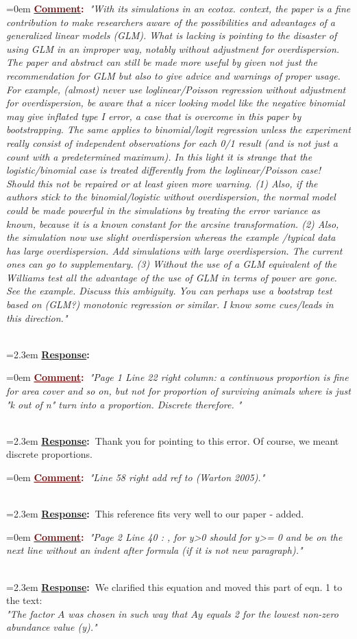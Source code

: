 \documentclass[12pt]{article}
\newcommand{\comment}[1]{
	\vspace{2em} \noindent \hangindent=0em \textbf{\textcolor{Maroon}{\uline{Comment}:~}}\emph{"#1"}
	}
\newcommand{\response}[1]{
	\\[0.25em] 
	\hangindent=2.3em \textbf{\textcolor{NavyBlue}{\uline{Response}:~}}#1 
	}
\begin{document}
\comment{With its simulations in an ecotox. context, the paper is a fine contribution to make researchers aware of the possibilities and advantages of a generalized linear models (GLM). What is lacking is pointing to the disaster of using GLM in an improper way, notably without adjustment for overdispersion. The paper and abstract can still be made more useful by given not just the recommendation for GLM but also to give advice and warnings of proper usage. For example, (almost) never use loglinear/Poisson regression without adjustment for overdispersion, be aware that a nicer looking model like the negative binomial may give inflated type I error, a case that is overcome in this paper by bootstrapping. The same applies to binomial/logit regression unless the experiment really consist of independent observations for each 0/1 result (and is not just a count with a predetermined maximum). In this light it is strange that the logistic/binomial case is treated differently from
the loglinear/Poisson case! Should this not be repaired or at least given more warning. 
(1) Also, if the authors stick to the binomial/logistic without overdispersion, the normal model could be made powerful in the simulations by treating the error variance as known, because it is a known constant for the arcsine transformation. 
(2) Also, the simulation now use slight overdispersion whereas the example /typical data has large overdispersion. Add simulations with large overdispersion. The current ones can go to supplementary.
(3) Without the use of a GLM equivalent of the Williams test all the advantage of the use of GLM in terms of power are gone.  See the example. Discuss this ambiguity. You can perhaps use a bootstrap test based on (GLM?) monotonic regression or similar. I know some cues/leads in this direction.}
\response{}

\comment{Page 1 Line 22 right column: a continuous proportion is fine for area cover and so on, but not for proportion of surviving animals where is just "k out of n" turn into a proportion. Discrete therefore. }
\response{Thank you for pointing to this error. Of course, we meant discrete proportions.}

\comment{Line 58 right add ref to (Warton 2005).}
\response{This reference fits very well to our paper - added.}

\comment{Page 2 Line 40 : , for y>0 should for y>= 0 and  be on the next line without an indent after formula (if it is not new paragraph).}
\response{We clarified this equation and moved this part of eqn. 1 to the text: \\
\emph{"The factor $A$ was chosen in such way that $Ay$ equals 2 for the lowest non-zero abundance value (y)."}}
\end{document}
